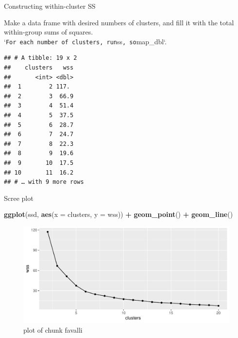 \documentclass[ignorenonframetext,]{beamer}
\newenvironment{Shaded}{\begin{snugshade}}{\end{snugshade}}
\newcommand{\DataTypeTok}[1]{\textcolor[rgb]{0.13,0.29,0.53}{#1}}
\newcommand{\DecValTok}[1]{\textcolor[rgb]{0.00,0.00,0.81}{#1}}
\newcommand{\KeywordTok}[1]{\textcolor[rgb]{0.13,0.29,0.53}{\textbf{#1}}}
\newcommand{\NormalTok}[1]{#1}
\newcommand{\OperatorTok}[1]{\textcolor[rgb]{0.81,0.36,0.00}{\textbf{#1}}}
\newcommand{\StringTok}[1]{\textcolor[rgb]{0.31,0.60,0.02}{#1}}
\begin{document}
\begin{frame}[fragile]{Constructing within-cluster SS}
\protect\hypertarget{constructing-within-cluster-ss}{}

Make a data frame with desired numbers of clusters, and fill it with the
total within-group sums of squares.
`\texttt{For\ each\ number\ of\ clusters,\ run}ss\texttt{\textquotesingle{}\textquotesingle{},\ so}map\_dbl`.

\begin{Shaded}
\end{Shaded}

\begin{verbatim}
## # A tibble: 19 x 2
##    clusters   wss
##       <int> <dbl>
##  1        2 117. 
##  2        3  66.9
##  3        4  51.4
##  4        5  37.5
##  5        6  28.7
##  6        7  24.7
##  7        8  22.3
##  8        9  19.6
##  9       10  17.5
## 10       11  16.2
## # … with 9 more rows
\end{verbatim}

\end{frame}

\begin{frame}[fragile]{Scree plot}
\protect\hypertarget{scree-plot}{}

\begin{Shaded}
\begin{Highlighting}[]
\KeywordTok{ggplot}\NormalTok{(ssd, }\KeywordTok{aes}\NormalTok{(}\DataTypeTok{x =}\NormalTok{ clusters, }\DataTypeTok{y =}\NormalTok{ wss)) }\OperatorTok{+}\StringTok{ }\KeywordTok{geom_point}\NormalTok{() }\OperatorTok{+}
\StringTok{  }\KeywordTok{geom_line}\NormalTok{()}
\end{Highlighting}
\end{Shaded}

\begin{figure}
\centering
\includegraphics{figure/favalli-1.pdf}
\caption{plot of chunk favalli}
\end{figure}

\end{frame}
\end{document}
